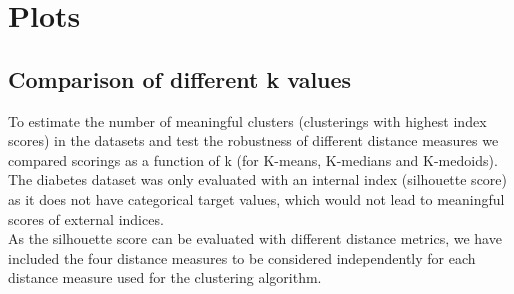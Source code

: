 \section{Plots}

\subsection{Comparison of different k values}
To estimate the number of meaningful clusters (clusterings with highest index scores) in the datasets and test the robustness of different distance measures we compared scorings as a function of k (for K-means, K-medians and K-medoids). The diabetes dataset was only evaluated with an internal index (silhouette score) as it does not have categorical target values, which would not lead to meaningful scores of external indices.  \\
As the silhouette score can be evaluated with different distance metrics, we have included the four distance measures to be considered independently for each distance measure used for the clustering algorithm. 

